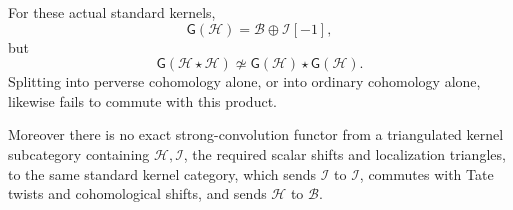 \begin{finding}
\label{f:weightextraction}
For these actual standard kernels,
\begin{equation}\label{eq:weightgradedH}
                  \mathsf G(\mathcal H)
                     =\mathcal B\oplus\mathcal I[-1],
\end{equation}
but
\begin{equation}\label{eq:weightgradednotmonoidal}
 \mathsf G(\mathcal H\star\mathcal H)
       \not\simeq
 \mathsf G(\mathcal H)\star\mathsf G(\mathcal H).
\end{equation}
Splitting into perverse cohomology alone, or into ordinary
cohomology alone, likewise fails to commute with this product.

Moreover there is no exact strong-convolution functor from
a triangulated kernel subcategory containing
\(\mathcal H,\mathcal I\), the required scalar shifts and
localization triangles, to the same standard kernel category,
which sends \(\mathcal I\) to \(\mathcal I\), commutes with
Tate twists and cohomological shifts, and sends
\(\mathcal H\) to \(\mathcal B\).
\end{finding}

